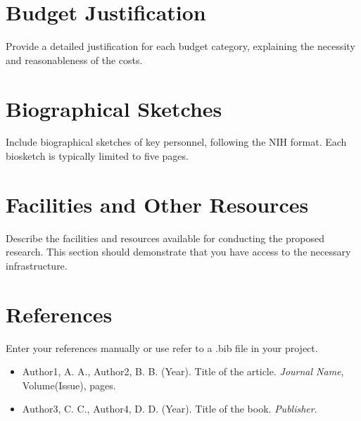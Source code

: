 \documentclass{article}
\begin{document}
\newpage

\section{Budget Justification}
Provide a detailed justification for each budget category, explaining the necessity and reasonableness of the costs.

\newpage

\section{Biographical Sketches}
Include biographical sketches of key personnel, following the NIH format. Each biosketch is typically limited to five pages.

\newpage

\section{Facilities and Other Resources}
Describe the facilities and resources available for conducting the proposed research. This section should demonstrate that you have access to the necessary infrastructure.

\newpage

\section{References}
Enter your references manually or use refer to a .bib file in your project.

\begin{itemize}
    \item Author1, A. A., Author2, B. B. (Year). Title of the article. \textit{Journal Name}, Volume(Issue), pages.
    \item Author3, C. C., Author4, D. D. (Year). Title of the book. \textit{Publisher}.
\end{itemize}

%
%
\end{document}
